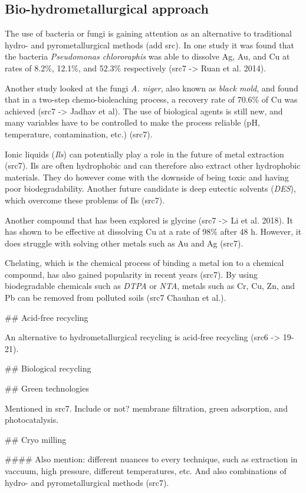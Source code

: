 \subsection{Bio-hydrometallurgical approach}

The use of bacteria or fungi is gaining attention as an alternative to traditional hydro- and pyrometallurgical methods (add src). In one study it was found that the bacteria \textit{Pseudomonas chlororaphis} was able to dissolve Ag, Au, and Cu at rates of 8.2\%, 12.1\%, and 52.3\% respectively (src7 -> Ruan et al. 2014). 

Another study looked at the fungi \textit{A. niger}, also known as \textit{black mold}, and found that in a two-step chemo-bioleaching process, a recovery rate of 70.6\% of Cu was achieved (src7 -> Jadhav et al). The use of biological agents is still new, and many variables have to be controlled to make the process reliable (pH, temperature, contamination, etc.) (src7). 

Ionic liquids (\textit{Ils}) can potentially play a role in the future of metal extraction (src7). Ils are often hydrophobic and can therefore also extract other hydrophobic materials. They do however come with the downside of being toxic and having poor biodegradability. Another future candidate is deep eutectic solvents (\textit{DES}), which overcome these problems of Ils (src7). 

Another compound that has been explored is glycine (src7 -> Li et al. 2018). It has shown to be effective at dissolving Cu at a rate of 98\% after 48 h. However, it does struggle with solving other metals such as Au and Ag (src7).

Chelating, which is the chemical process of binding a metal ion to a chemical compound, has also gained popularity in recent years (src7). By using biodegradable chemicals such as \textit{DTPA} or \textit{NTA}, metals such as Cr, Cu, Zn, and Pb can be removed from polluted soils (src7 Chauhan et al.).



## Acid-free recycling

An alternative to hydrometallurgical recycling is acid-free recycling (src6 -> 19-21).

## Biological recycling

## Green technologies

Mentioned in src7. Include or not? membrane filtration, green adsorption, and photocatalysis.

## Cryo milling


#### Also mention:
different nuances to every technique, such as extraction in vaccuum, high pressure, different temperatures, etc. And also combinations of hydro- and pyrometallurgical methods (src7).